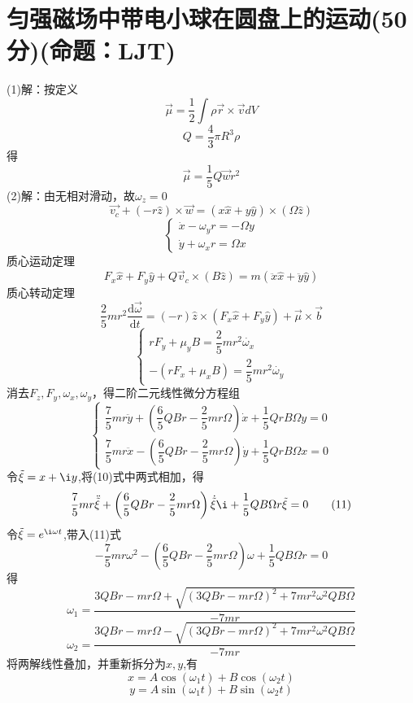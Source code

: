 \documentclass{article}
\begin{document}
\section*{匀强磁场中带电小球在圆盘上的运动(50分)(命题：LJT)}
\[\]
(1)解：按定义
\[\vec{\mu }=\dfrac{1}{2}\int \rho \vec{r}\times \vec{v}dV\tag{1}\]
\[Q=\dfrac{4}{3}\pi R^{3}\rho\tag{2}\]
得
\[\vec{\mu }=\dfrac{1}{5}Q\vec{w}r^{2}\tag{3}\]
(2)解：由无相对滑动，故$\omega_z=0$
\[\vec{v_{c}}+\left( -r\hat{z}\right) \times \vec{w}=\left( x\hat{x}+y\hat{y}\right) \times \left( \Omega \hat{z}\right) \tag{4}\]
\[
\begin{cases}
    \dot{x}-\omega_{y}r=-\Omega y\\
    \dot{y}+\omega_{x} r=\Omega x
\end{cases}
\tag{5}
\]
质心运动定理
\[
F_x \hat{x}+F_y\hat{y}+Q\vec{v}_{c}\times \left( B\hat{z}\right) =m\left( \ddot{x}\hat{x}+ \ddot{y}\hat{y}\right)
\tag{7}
\]
质心转动定理
\[
\dfrac{2}{5}mr^{2}\dfrac{\mathrm{d}\vec{\omega}}{\mathrm{d}t}=\left( -r\right) \hat{z}\times \left( F_{x}\hat{x}+F_{y}\hat{y}\right) +\vec{\mu }\times \vec{b}
\tag{8}
\]
\[
\begin{cases}
    rF_y+\mu _{y}B=\dfrac{2}{5}mr^{2}\dot{\omega_x}\\
    -\left( rF_{x}+\mu _{x}B\right) =\dfrac{2}{5}mr^{2}\dot{\omega_y}
\end{cases}
\tag{9}
\]
消去$F_z,F_y,\omega_x,\omega_y$，得二阶二元线性微分方程组
\[
\begin{cases}
    \dfrac{7}{5}mr\ddot{y}+\left( \dfrac{6}{5}QBr-\dfrac{2}{5}mr\Omega \right) \dot{x}+\dfrac{1}{5}QrB\Omega y=0\\
    \dfrac{7}{5}mr\ddot{x}-\left( \dfrac{6}{5}QBr-\dfrac{2}{5}mr\Omega \right) \dot{y}+\dfrac{1}{5}QrB\Omega x=0
\end{cases}
\tag{10}
\]
令$\tilde{\xi}=x+\i y$,将(10)式中两式相加，得
\[
\dfrac{7}{5}mr\ddot{\tilde{\xi}}+\left( \dfrac{6}{5}QBr-\dfrac{2}{5}mr\Omega \right)\dot{\tilde{\xi}}\i+\dfrac{1}{5}QB\Omega r\tilde{\xi}=0
\tag{11}
\]
令$\tilde{\xi}=e^{\i\omega t}$,带入(11)式
\[
-\dfrac{7}{5}mr\omega ^{2}-\left( \dfrac{6}{5}QBr -\dfrac{2}{5}mr\Omega \right) \omega +\dfrac{1}{5}QB\Omega r=0
\tag{12}
\]
得
\[
\omega_{1}=\dfrac{3QBr-mr\Omega +\sqrt{\left( 3QBr-mr\Omega \right) ^{2}+7mr^{2}\omega^{2}QB\Omega }}{-7mr}
\tag{13}
\]
\[
\omega_{2}=\dfrac{3QBr-mr\Omega -\sqrt{\left( 3QBr-mr\Omega \right) ^{2}+7mr^{2}\omega^{2}QB\Omega }}{-7mr}
\tag{14}
\]
将两解线性叠加，并重新拆分为$x,y$,有
\[
x=A\cos \left( \omega _{1}t\right) +B\cos\left( \omega_{2}t\right)
\]
\[
y=A\sin \left( \omega _{1}t\right) +B\sin\left( \omega_{2}t\right)
\]
\end{document}
